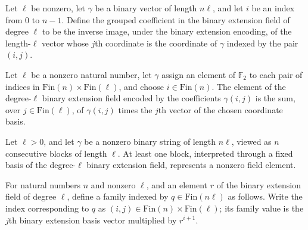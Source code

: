 \begin{definition}
\label{FABL.basisExpandedGroupedCoefficient}
\leanok
{}
Let $\ell$ be nonzero, let $\gamma$ be a binary vector of length $n\ell$, and let $i$ be an index
from $0$ to $n-1$. Define the grouped coefficient in the binary extension field of
degree $\ell$ to be the inverse image, under the binary extension encoding, of the
length-$\ell$ vector whose $j$th coordinate is the coordinate of $\gamma$ indexed by the pair
$(i,j)$.
\end{definition}

\begin{theorem}
\label{FABL.basisExpandedGroupedCoefficient_eq_sum}
\leanok
{}
Let $\ell$ be a nonzero natural number, let $\gamma$ assign an element of $\mathbb
F_2$ to each pair of indices in $\mathrm{Fin}(n)\times\mathrm{Fin}(\ell)$, and
choose $i\in\mathrm{Fin}(n)$. The element of the degree-$\ell$ binary extension field
encoded by the coefficients $\gamma(i,j)$ is the sum, over $j\in\mathrm{Fin}(\ell)$,
of $\gamma(i,j)$ times the $j$th vector of the chosen coordinate basis.
\end{theorem}

\begin{theorem}
\label{FABL.exists_basisExpandedGroupedCoefficient_ne_zero}
\leanok
{}
Let $\ell>0$, and let $\gamma$ be a nonzero binary string of length $n\ell$, viewed as
$n$ consecutive blocks of length $\ell$. At least one block, interpreted through a fixed
basis of the degree-$\ell$ binary extension field, represents a nonzero field element.
\end{theorem}

\begin{definition}
\label{FABL.basisExpandedSmallBiasFieldFamily}
\leanok
{}
For natural numbers $n$ and nonzero $\ell$, and an element $r$ of the binary extension
field of degree $\ell$, define a family indexed by $q\in\mathrm{Fin}(n\ell)$ as follows.
Write the index corresponding to $q$ as
$(i,j)\in\mathrm{Fin}(n)\times\mathrm{Fin}(\ell)$; its family value is the $j$th binary
extension basis vector multiplied by $r^{i+1}$.
\end{definition}


